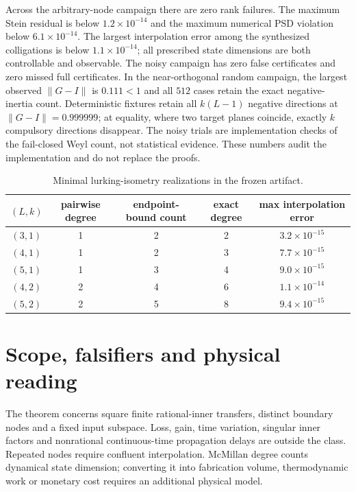 \documentclass[11pt]{article}
\theoremstyle{definition}
\theoremstyle{remark}
\newcommand{\norm}[1]{\lVert#1\rVert}
\begin{document}
Across the arbitrary-node campaign there are zero rank failures.  The maximum
Stein residual is below $1.2\times10^{-14}$ and the maximum numerical PSD
violation below $6.1\times10^{-14}$.  The largest interpolation error among
the synthesized colligations is below $1.1\times10^{-14}$; all prescribed
state dimensions are both controllable and observable.  The noisy campaign
has zero false certificates and zero missed full certificates.  In the
near-orthogonal random campaign, the largest observed $\norm{G-I}$ is
$0.111<1$ and all $512$ cases retain the exact negative-inertia count.
Deterministic fixtures retain all $k(L-1)$ negative directions at
$\norm{G-I}=0.999999$; at equality, where two target planes coincide, exactly
$k$ compulsory directions disappear.  The noisy trials are implementation
checks of the fail-closed Weyl count, not statistical evidence.  These
numbers audit the implementation and do not replace the proofs.

\begin{table}[t]
\centering
\small
\begin{tabular}{@{}ccccc@{}}
\toprule
$(L,k)$ & pairwise degree & endpoint-bound count & exact degree
& max interpolation error \\
\midrule
$(3,1)$ & 1 & 2 & 2 & $3.2\times10^{-15}$ \\
$(4,1)$ & 1 & 2 & 3 & $7.7\times10^{-15}$ \\
$(5,1)$ & 1 & 3 & 4 & $9.0\times10^{-15}$ \\
$(4,2)$ & 2 & 4 & 6 & $1.1\times10^{-14}$ \\
$(5,2)$ & 2 & 5 & 8 & $9.4\times10^{-15}$ \\
\bottomrule
\end{tabular}
\caption{Minimal lurking-isometry realizations in the frozen artifact.}
\label{tab:colligations}
\end{table}

\section{Scope, falsifiers and physical reading}

The theorem concerns square finite rational-inner transfers, distinct
boundary nodes and a fixed input subspace.  Loss, gain, time variation,
singular inner factors and nonrational continuous-time propagation delays are
outside the class.  Repeated nodes require confluent interpolation.  McMillan
degree counts dynamical state dimension; converting it into fabrication
volume, thermodynamic work or monetary cost requires an additional physical
model.
\end{document}
